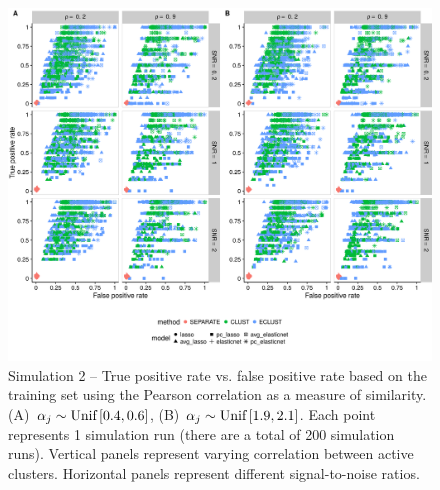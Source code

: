 \begin{appendices}
\begin{figure}
	\includegraphics[scale=0.57, keepaspectratio]{./figs/hydra/results/figures/sim2-sept8/tpr_fpr_Correlation_sim2.png}
	\caption{Simulation 2 -- True positive rate vs. false positive rate based on the training set using the Pearson correlation as a measure of similarity. \mbox{(A) $\alpha_{j} \sim \textrm{{Unif}}\left[0.4, 0.6\right]$}, \mbox{(B) $\alpha_{j} \sim \textrm{{Unif}}\left[1.9, 2.1\right]$}. Each point represents 1 simulation run (there are a total of 200 simulation runs). Vertical panels represent varying correlation between active clusters. Horizontal panels represent different signal-to-noise ratios.}
	\label{fig:tpr_fpr_Correlation_sim2}
\end{figure}




\end{appendices}
